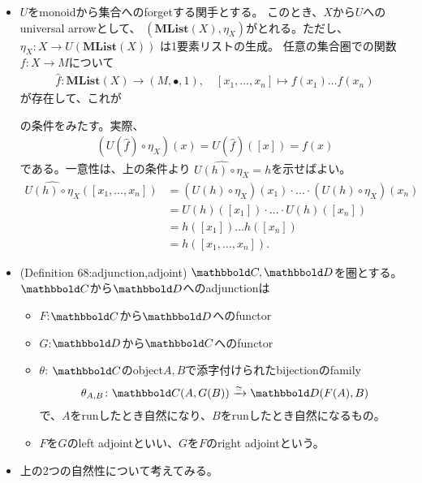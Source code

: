 \documentclass[9pt]{ltjsarticle}
\renewcommand{\bf}{\mathbf}
\begin{document}
\begin{itemize}
  \item
  $U$をmonoidから集合へのforgetする関手とする。
  このとき、$X$から$U$へのuniversal arrowとして、
  $(\bf{MList}(X),\eta_X)$がとれる。ただし、$\eta_X\colon X\to U(\bf{MList}(X))$
  は1要素リストの生成。
  \pf
  任意の集合圏での関数$f\colon X\to M$について
  \begin{align}
    \hat f\colon
    \bf{MList}(X) \to (M,\bullet, 1)
    ,\quad
    [x_1,\dots,x_n] \mapsto f(x_1)\dots f(x_n)
  \end{align}
  が存在して、これが
  の条件をみたす。実際、
  \begin{align}
    (U(\hat f)\circ \eta_X)(x) = U(\hat f)([x]) = f(x)
  \end{align}
  である。一意性は、上の条件より
  $\hat{U(h)\circ \eta_X}=h$を示せばよい。
  \begin{align}
    \hat{U(h)\circ \eta_X}([x_1,\dots,x_n])
    &=
    (U(h)\circ \eta_X)(x_1)\cdot \dots \cdot (U(h)\circ \eta_X)(x_n)\\
    &=
    U(h)([x_1])\cdot \dots \cdot U(h)([x_n])\\
    &=
    h([x_1])\dots h([x_n])\\
    &=
    h([x_1,\dots,x_n]).
  \end{align}
  \item
  (Definition 68:adjunction,adjoint)
  $\C,\D$を圏とする。$\C$から$\D$へのadjunctionは
  \begin{itemize}
    \item $F$:$\C$から$\D$へのfunctor
    \item $G$:$\D$から$\C$へのfunctor
    \item $\theta$: $\C$のobject$A,B$で添字付けられたbijectionのfamily
    \begin{align}
      \theta_{A,B} \colon \C( A, G(B)) \xrightarrow{\simeq} \D(F(A),B)
    \end{align}
    で、$A$をrunしたとき自然になり、$B$をrunしたとき自然になるもの。
    \item
    $F$を$G$のleft adjointといい、$G$を$F$のright adjointという。
  \end{itemize}
  \item
  上の2つの自然性について考えてみる。

\end{itemize}
\end{document}
